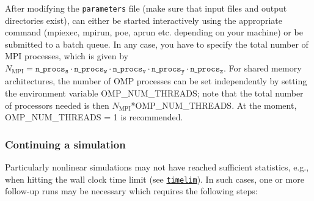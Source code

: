 \documentclass[12pt]{article}
\begin{document}
After modifying the \texttt{parameters} file (make sure that
input files and output directories exist), \gene can either
be started interactively using the appropriate command (mpiexec, mpirun, poe, aprun etc. depending on your
machine) or be submitted to a batch queue. In any case, you have to
specify the total number of MPI processes, which is given by
$N_\mathrm{MPI}=\mathtt{n\_procs_s}\cdot
\mathtt{n\_procs_w}\cdot\mathtt{n\_procs_v}\cdot\mathtt{n\_procs_y}\cdot\mathtt{n\_procs_z}$.
For shared memory architectures, the number of OMP processes can
be set independently by setting the environment variable
OMP\_NUM\_THREADS; note that the total number of processors needed
is then $N_\mathrm{MPI}$*OMP\_NUM\_THREADS. At the moment,
OMP\_NUM\_THREADS = 1 is recommended.

\subsubsection{Continuing a simulation}\label{subsubsec:continue_sim}

Particularly nonlinear simulations may not have reached sufficient statistics, e.g.,
when hitting the wall clock time limit (see \hyperlink{timelim}{\tt timelim}).
In such cases, one or more follow-up runs may be necessary which requires the following steps:
\end{document}
